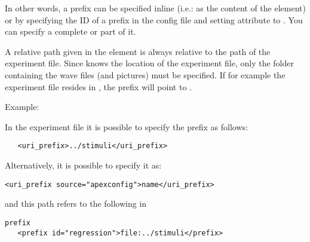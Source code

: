 In other words, a prefix can be specified inline (i.e.: as the
content of the  element) or by specifying the
ID of a prefix in the \apex config file and setting attribute
 to . You can specify a
complete or part of it.


A relative path given in the  element is
always relative to the path of the experiment file. Since \apex
knows the location of the experiment file, only the folder
containing the wave files (and pictures) must be specified. If for
example the experiment file resides in
, the prefix 
will point to .

Example:

In the experiment file it is possible to specify the prefix as
follows:
\begin{lstlisting}
   <uri_prefix>../stimuli</uri_prefix>
\end{lstlisting}

Alternatively, it is possible to specify it as:

\begin{lstlisting}
<uri_prefix source="apexconfig">name</uri_prefix>
\end{lstlisting}

and this path refers to the following in 

\begin{lstlisting}
prefix
   <prefix id="regression">file:../stimuli</prefix>
\end{lstlisting}

\label{sec:prefixes}


